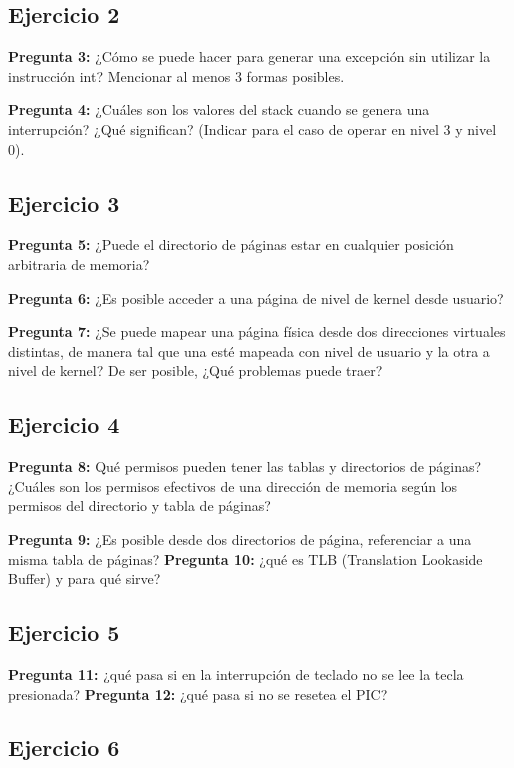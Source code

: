 \documentclass[10pt, a4paper]{article}
\begin{document}
\subsection{Ejercicio 2}
{\textbf{Pregunta 3:}} ¿Cómo se puede hacer para generar una excepción sin utilizar la instrucción int? Mencionar al menos 3 formas posibles.\newline

{\textbf{Pregunta 4:}} ¿Cuáles son los valores del stack cuando se genera una interrupción? ¿Qué significan? (Indicar para el caso de operar en nivel 3 y nivel 0).\newline


\subsection{Ejercicio 3}
{\textbf{Pregunta 5:}} ¿Puede el directorio de páginas estar en cualquier posición arbitraria de memoria?\newline

{\textbf{Pregunta 6:}} ¿Es posible acceder a una página de nivel de kernel desde usuario?\newline

{\textbf{Pregunta 7:}} ¿Se puede mapear una página física desde dos direcciones virtuales
distintas, de manera tal que una esté mapeada con nivel de usuario y la otra a nivel de kernel? De ser posible, ¿Qué problemas puede traer?\newline

\subsection{Ejercicio 4}
{\textbf{Pregunta 8:}} Qué permisos pueden tener las tablas y directorios de páginas? ¿Cuáles son los permisos efectivos de una dirección de memoria según los permisos del directorio
y tabla de páginas?

{\textbf{Pregunta 9:}} ¿Es posible desde dos directorios de página, referenciar a una misma tabla de páginas? 
{\textbf{Pregunta 10:}} ¿qué es TLB (Translation Lookaside Buffer) y para qué sirve?

\subsection{Ejercicio 5}
{\textbf{Pregunta 11:}} ¿qué pasa si en la interrupción de teclado no se lee la tecla presionada?
{\textbf{Pregunta 12:}} ¿qué pasa si no se resetea el PIC?
\subsection{Ejercicio 6}
\end{document}
